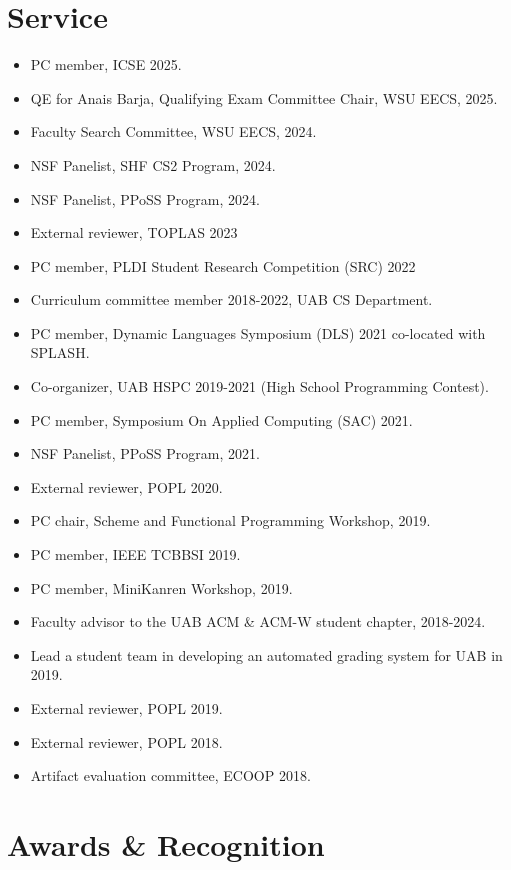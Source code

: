 \documentclass[line]{res}
\begin{document}
\begin{resume}
\section{\large Service} \vspace{0.15in}
\begin{itemize}
    \item PC member, ICSE 2025.
    \item QE for Anais Barja, Qualifying Exam Committee Chair, WSU EECS, 2025.
    \item Faculty Search Committee, WSU EECS, 2024.
    \item NSF Panelist, SHF CS2 Program, 2024.
    \item NSF Panelist, PPoSS Program, 2024.
    \item External reviewer, TOPLAS 2023
    \item PC member, PLDI Student Research Competition (SRC) 2022
    \item Curriculum committee member 2018-2022, UAB CS Department.
    \item PC member, Dynamic Languages Symposium (DLS) 2021 co-located with SPLASH.
    \item Co-organizer, UAB HSPC 2019-2021 (High School Programming Contest).
    \item PC member, Symposium On Applied Computing (SAC) 2021.
    \item NSF Panelist, PPoSS Program, 2021.
    \item External reviewer, POPL 2020.
    \item PC chair, Scheme and Functional Programming Workshop, 2019.
    \item PC member, IEEE TCBBSI 2019.
    \item PC member, MiniKanren Workshop, 2019.
    \item Faculty advisor to the UAB ACM \& ACM-W student chapter, 2018-2024.
    \item Lead a student team in developing an automated grading system for UAB in 2019.
    \item External reviewer, POPL 2019. 
    \item External reviewer, POPL 2018. 
    \item Artifact evaluation committee, ECOOP 2018.
\end{itemize}

\section{\large Awards \& Recognition} \vspace{0.2in}



\end{resume}
\end{document}

